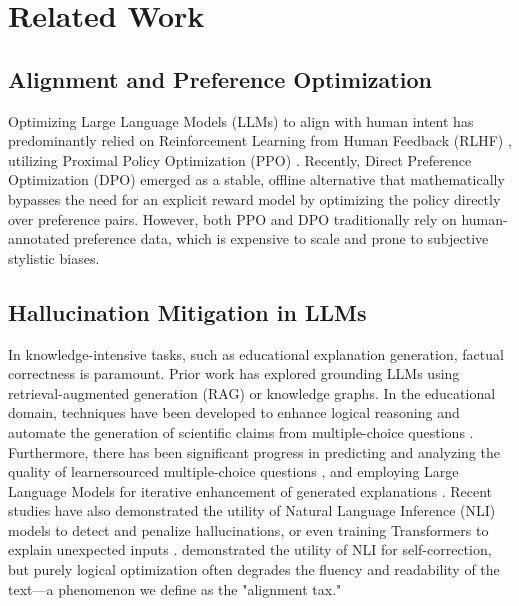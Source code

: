 \section{Related Work}

\subsection{Alignment and Preference Optimization}
Optimizing Large Language Models (LLMs) to align with human intent has predominantly relied on Reinforcement Learning from Human Feedback (RLHF) \cite{ouyang2022training}, utilizing Proximal Policy Optimization (PPO) \cite{schulman2017proximal}. Recently, Direct Preference Optimization (DPO) \cite{rafailov2023direct} emerged as a stable, offline alternative that mathematically bypasses the need for an explicit reward model by optimizing the policy directly over preference pairs. However, both PPO and DPO traditionally rely on human-annotated preference data, which is expensive to scale and prone to subjective stylistic biases.

\subsection{Hallucination Mitigation in LLMs}
In knowledge-intensive tasks, such as educational explanation generation, factual correctness is paramount. Prior work has explored grounding LLMs using retrieval-augmented generation (RAG) \cite{lewis2020retrieval} or knowledge graphs. In the educational domain, techniques have been developed to enhance logical reasoning \cite{bao2023enhancing, bao2024abstract} and automate the generation of scientific claims from multiple-choice questions \cite{bao2023multi2claim}. Furthermore, there has been significant progress in predicting and analyzing the quality of learnersourced multiple-choice questions \cite{bao2022deepqr}, and employing Large Language Models for iterative enhancement of generated explanations \cite{bao2025exploring}. Recent studies have also demonstrated the utility of Natural Language Inference (NLI) models \cite{honovich2022true} to detect and penalize hallucinations, or even training Transformers to explain unexpected inputs \cite{bao2022abductionrules}. \cite{gao2023enabling} demonstrated the utility of NLI for self-correction, but purely logical optimization often degrades the fluency and readability of the text---a phenomenon we define as the "alignment tax."

